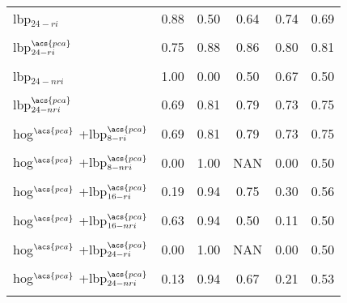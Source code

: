 \begin{table*}
{\begin{tabular}{l ccccc}
  \acs{lbp}$_{24-ri}$ & 0.88 & 0.50 & 0.64 & 0.74 & 0.69\\
  \multicolumn{6}{c}{}\\[-1.5ex] 

  \acs{lbp}$_{24-ri}^{\acs{pca}}$ & 0.75 & 0.88 & 0.86 & 0.80 & 0.81\\
  \multicolumn{6}{c}{}\\[-1.5ex]  
 
  \acs{lbp}$_{24-nri}$ & 1.00 & 0.00 & 0.50 & 0.67 & 0.50\\
  \multicolumn{6}{c}{}\\[-1.5ex] 

  \acs{lbp}$_{24-nri}^{\acs{pca}}$ & 0.69 & 0.81 & 0.79 & 0.73 & 0.75\\
  \multicolumn{6}{c}{}\\[-1.5ex] 
  
   \acs{hog}$^{\acs{pca}}$ +\acs{lbp}$_{8-ri}^{\acs{pca}}$ & 0.69 & 0.81 & 0.79 & 0.73 & 0.75\\
  \multicolumn{6}{c}{}\\[-1.5ex]

   \acs{hog}$^{\acs{pca}}$ +\acs{lbp}$_{8-nri}^{\acs{pca}}$ & 0.00 & 1.00 & NAN & 0.00 & 0.50\\
  \multicolumn{6}{c}{}\\[-1.5ex]

   \acs{hog}$^{\acs{pca}}$ +\acs{lbp}$_{16-ri}^{\acs{pca}}$ & 0.19 & 0.94 & 0.75 & 0.30 & 0.56\\
  \multicolumn{6}{c}{}\\[-1.5ex]

  \acs{hog}$^{\acs{pca}}$ +\acs{lbp}$_{16-nri}^{\acs{pca}}$ & 0.63 & 0.94 & 0.50 & 0.11 & 0.50\\
  \multicolumn{6}{c}{}\\[-1.5ex]

 \acs{hog}$^{\acs{pca}}$ +\acs{lbp}$_{24-ri}^{\acs{pca}}$ & 0.00 & 1.00 & NAN & 0.00 & 0.50\\
  \multicolumn{6}{c}{}\\[-1.5ex]

  \acs{hog}$^{\acs{pca}}$ +\acs{lbp}$_{24-nri}^{\acs{pca}}$ & 0.13 & 0.94 & 0.67 & 0.21 & 0.53\\
  \multicolumn{6}{c}{}\\[-1.5ex]
 
\bottomrule
\end{tabular}}
\end{table*}


